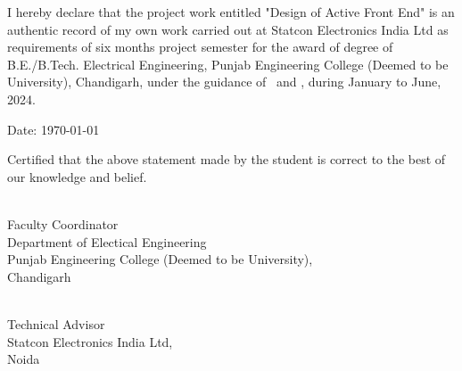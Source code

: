 I hereby declare that the project work entitled "Design of Active Front End" is
an authentic record of my own work carried out at Statcon Electronics India Ltd
as requirements of six months project semester for the award of degree of
B.E./B.Tech. Electrical Engineering, Punjab Engineering College (Deemed to be
University), Chandigarh, under the guidance of \industry\ and \faculty, during
January to June, 2024.

\vspace*{2.5cm}
\noindent
\begin{minipage}[t]{0.5\textwidth}
    \raggedright
    {Date: {\today}}
\end{minipage}
\hfill
\begin{minipage}[t]{0.5\textwidth}

\end{minipage}
\vfill

\noindent
Certified that the above statement made by the student is correct to the best of our knowledge and belief.

\vspace*{2cm}

\noindent
\begin{minipage}[t]{0.5\textwidth}
    \raggedright
    \faculty \\
    Faculty Coordinator\\
    Department of Electical Engineering\\
    Punjab Engineering College (Deemed to be University),\\
    Chandigarh
\end{minipage}
\hfill
\begin{minipage}[t]{0.5\textwidth}
    \raggedleft
    \industry \\
    Technical Advisor\\
    Statcon Electronics India Ltd,\\
    Noida

\end{minipage}